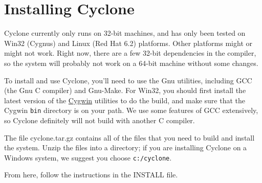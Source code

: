 \section{Installing Cyclone}
\label{sec:install}
Cyclone currently only runs on 32-bit machines, and has only been
tested on Win32 (Cygnus) and Linux (Red Hat 6.2) platforms.  Other
platforms might or might not work.  Right now, there are a few 32-bit
dependencies in the compiler, so the system will probably not work on
a 64-bit machine without some changes.

To install and use Cyclone, you'll need to use the Gnu utilities,
including GCC (the Gnu C compiler) and Gnu-Make.  For Win32, you
should first install the latest version of the
\href{http://cygwin.com/}{Cygwin} utilities to do the build, and make
sure that the Cygwin \texttt{bin} directory is on your path. We use
some features of GCC extensively, so Cyclone definitely will not build
with another C compiler.

The file cyclone.tar.gz contains all of the files
that you need to build and install the system.  Unzip the files into a
directory; if you are installing Cyclone on a Windows system, we
suggest you choose \texttt{c:/cyclone}.  

From here, follow the instructions in the INSTALL file.






